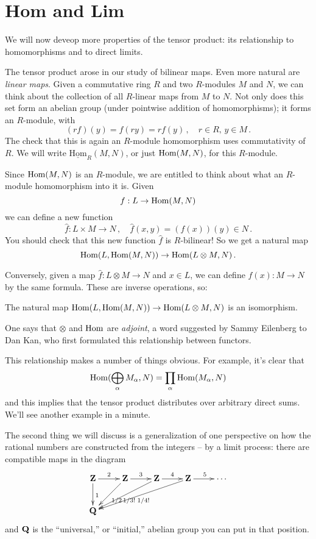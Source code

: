 \section{Hom and Lim}\label{limits}

We will now deveop more properties of the tensor product: its relationship to
homomorphisms and to direct limits. 

The tensor product arose in our study of bilinear maps. Even more natural are
{\em linear maps}. Given a commutative ring $R$ and two $R$-modules $M$ and 
$N$, we can think about the collection of all $R$-linear maps from $M$ to $N$.
Not only does this set form an abelian group (under pointwise addition of 
homomorphisms); it forms an $R$-module, with
\[
(rf)(y)=f(ry)=rf(y)\,,\quad r\in R,\, y\in M\,.
\]
The check that this is again an $R$-module homomorphism uses commutativity of
$R$. We will write $\underline{\mathrm{Hom}}_R(M,N)$, or just $\operatorname{Hom}(M,N)$, 
for this $R$-module. 

Since $\operatorname{Hom}(M,N)$ is an $R$-module, we are entitled to think about what 
an $R$-module homomorphism into it is. Given 
\[
f:L\to\operatorname{Hom}(M,N)
\]
we can define a new function 
\[
\hat f:L\times M\to N\,,\quad \hat f(x,y)=(f(x))(y)\in N\,.
\]
You should check that this new function $\hat f$ is $R$-bilinear! So we get 
a natural map
\[
\operatorname{Hom}(L,\operatorname{Hom}(M,N))\to\operatorname{Hom}(L\otimes M,N)\,.
\]

Conversely, given a map $\hat f:L\otimes M\to N$ and $x\in L$, we can define
$f(x):M\to N$ by the same formula. These are inverse operations, so:
\begin{lemma}
The natural map $\operatorname{Hom}(L,\operatorname{Hom}(M,N))\to\operatorname{Hom}(L\otimes M,N)$ is an isomorphism.
\end{lemma}

One says that $\otimes$ and $\operatorname{Hom}$ are {\em adjoint}, a word suggested by 
Sammy Eilenberg to Dan Kan, who first formulated this relationship between
functors. 

This relationship makes a number of things obvious. For example, it's clear 
that 
\[
\operatorname{Hom}(\bigoplus_\alpha M_\alpha,N)=\prod_\alpha\operatorname{Hom}(M_\alpha,N)
\]
and this implies that the tensor product distributes over arbitrary
direct sums. We'll see another example in a minute. 

The second thing we will discuss is a generalization of one perspective on
how the rational numbers are constructed from the integers -- by a limit 
process: there are compatible maps in the diagram 
\[
\xymatrix{
\Z \ar[r]^2 \ar[d]^1 & \Z \ar[r]^3 \ar[dl]^{1/2} & \Z \ar[r]^4 \ar[dll]^{1/3!}
& \Z \ar[r]^5 \ar[dlll]^{1/4!} & \cdots \\
\QQ 
}\]
and $\mathbf Q$ is the ``universal,'' or ``initial,'' abelian group you can put
in that position. 

